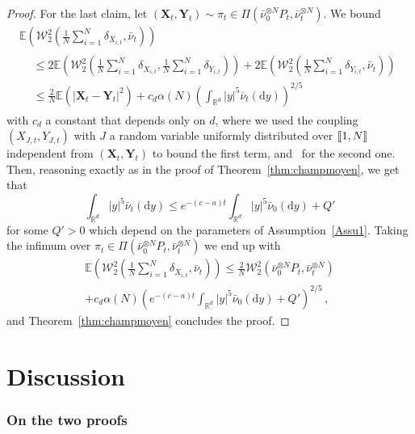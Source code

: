 \documentclass[10pt]{amsart}
\theoremstyle{definition}\newtheorem{defi}[theo]{Definition}\newtheorem{rema}[theo]{Remark}\newtheorem{exam}[theo]{Example}\newtheorem{exem}[theo]{Example}\newtheorem{nota}[theo]{Notation}
\newcommand{\llbracket}{\mathopen{[\mkern -2.7mu[}}
\newcommand{\rrbracket}{\mathclose{]\mkern -2.7mu]}}
\newcommand{\R}{\mathbb R}
\newcommand{\bbE}{\mathbb E}
\newcommand{\clW}{\mathcal W}
\newcommand{\dd}{\mathrm{d}}
\newcommand{\1}{\mathbbm{1}}
\newcommand{\bX}{\mathbf{X}}
\newcommand{\bY}{\mathbf{Y}}
\providecommand{\llbracket}{\mathopen{[\mkern-2.7mu[}}\providecommand{\rrbracket}{\mathclose{]\mkern-2.7mu]}}
\begin{document}
\begin{proof}
For the last claim, let $(\bX_t,\bY_t)\sim \pi_t\in \Pi(\bar\nu_0^{\otimes N} P_t,\bar \nu_t^{\otimes N})$. We bound
\begin{multline*}
\bbE \left( \clW_2^2 \left( \frac1N \sum_{i=1}^N \delta_{X_{i,t}}, \bar\nu_t\right) \right)\\
\begin{aligned}
& \leqslant 2 \bbE \left( \clW_2^2 \left( \frac1N \sum_{i=1}^N \delta_{X_{i,t}}, \frac1N \sum_{i=1}^N \delta_{Y_{i,t}} \right)\right) + 2 \bbE \left( \clW_2^2 \left( \frac1N \sum_{i=1}^N \delta_{Y_{i,t}}, \bar\nu_t\right) \right)\\
& \leqslant \frac{2}N \bbE\left( |\bX_t-\bY_t|^2\right) + c_d \alpha(N)\left(\int_{\R^d} |y|^5 \bar \nu_t(\dd y)\right)^{2/5}
\end{aligned}
\end{multline*}
with $c_d$ a constant that depends only on $d$, where we used the coupling $(X_{J,t},Y_{J,t})$ with $J$ a random variable uniformly distributed over $\llbracket 1,N\rrbracket$ independent from $(\bX_t,\bY_t)$ to bound the first term, and~\cite[Theorem~1]{FournierGuillin} for the second one. Then, reasoning exactly as in the proof of Theorem~\ref{thm:champmoyen}, we get that
\[
\int_{\R^d} |y|^5 \bar \nu_t(\dd y) \leqslant e^{-(c-a)t}\int_{\R^d} |y|^5 \bar \nu_0(\dd y) + Q'
\]
for some $Q'>0$ which depend on the parameters of Assumption~\ref{Assu1}. Taking the infimum over $\pi_t\in \Pi\left(\bar\nu_0^{\otimes N} P_t,\bar \nu_t^{\otimes N}\right)$ we end up with
\begin{multline*}
\bbE \left( \clW_2^2 \left( \frac1N \sum_{i=1}^N \delta_{X_{i,t}}, \bar\nu_t\right) \right)
\leqslant \frac{2}N \clW_2^2\left( \bar\nu_0^{\otimes N} P_t,\bar \nu_t^{\otimes N}\right) \\ + c_d \alpha(N)\left( e^{-(c-a)t}\int_{\R^d} |y|^5 \bar \nu_0(\dd y) + Q'\right)^{2/5}\,,
\end{multline*}
and Theorem~\ref{thm:champmoyen} concludes the proof.
\end{proof}


\section{Discussion}\label{sec:discussion}
\label{Sec:reflexionProof}



\subsubsection*{On the two proofs}
\end{document}
